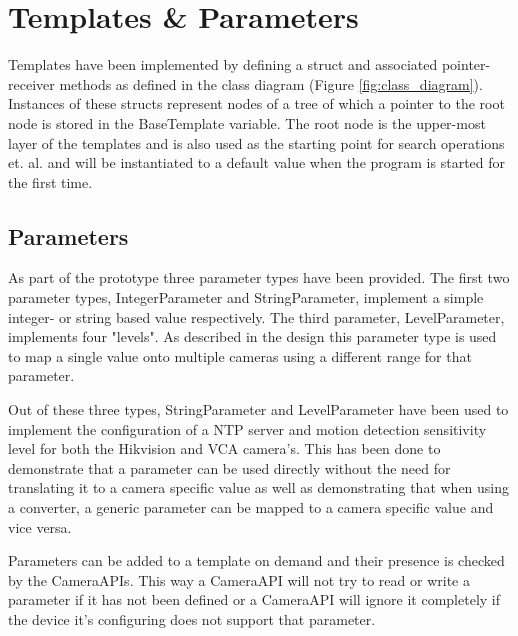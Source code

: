 \section{Templates \& Parameters}
Templates have been implemented by defining a struct and associated pointer-receiver methods as defined in the class diagram (Figure \ref{fig:class_diagram}).
Instances of these structs represent nodes of a tree of which a pointer to the root node is stored in the BaseTemplate variable.
The root node is the upper-most layer of the templates and is also used as the starting point for search operations et. al. and will be instantiated to a default value when the program is started for the first time.

\subsection{Parameters}
As part of the prototype three parameter types have been provided.
The first two parameter types, IntegerParameter and StringParameter, implement a simple integer- or string based value respectively.
The third parameter, LevelParameter, implements four "levels".
As described in the design this parameter type is used to map a single value onto multiple cameras using a different range for that parameter.

Out of these three types, StringParameter and LevelParameter have been used to implement the configuration of a NTP server and motion detection sensitivity level for both the Hikvision and VCA camera's.
This has been done to demonstrate that a parameter can be used directly without the need for translating it to a camera specific value as well as demonstrating that when using a converter, a generic parameter can be mapped to a camera specific value and vice versa.

Parameters can be added to a template on demand and their presence is checked by the CameraAPIs.
This way a CameraAPI will not try to read or write a parameter if it has not been defined or a CameraAPI will ignore it completely if the device it's configuring does not support that parameter.

